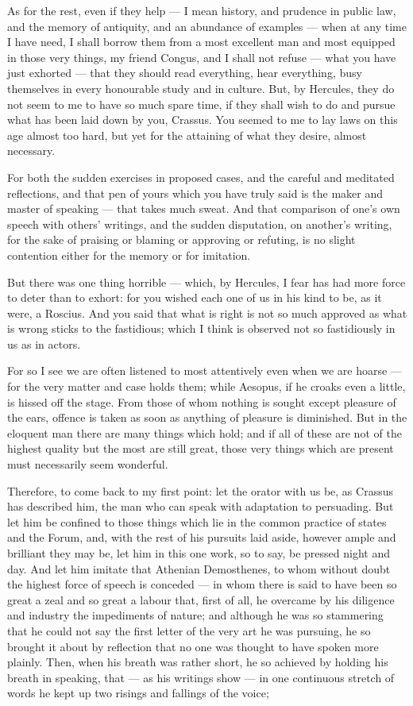  As for the rest, even if they help — I mean history, and prudence in public law, and the memory of antiquity, and an abundance of examples — when at any time I have need, I shall borrow them from a most excellent man and most equipped in those very things, my friend Congus, and I shall not refuse — what you have just exhorted — that they should read everything, hear everything, busy themselves in every honourable study and in culture. But, by Hercules, they do not seem to me to have so much spare time, if they shall wish to do and pursue what has been laid down by you, Crassus. You seemed to me to lay laws on this age almost too hard, but yet for the attaining of what they desire, almost necessary.

 For both the sudden exercises in proposed cases, and the careful and meditated reflections, and that pen of yours which you have truly said is the maker and master of speaking — that takes much sweat. And that comparison of one's own speech with others' writings, and the sudden disputation, on another's writing, for the sake of praising or blaming or approving or refuting, is no slight contention either for the memory or for imitation.

 But there was one thing horrible — which, by Hercules, I fear has had more force to deter than to exhort: for you wished each one of us in his kind to be, as it were, a Roscius. And you said that what is right is not so much approved as what is wrong sticks to the fastidious; which I think is observed not so fastidiously in us as in actors.

 For so I see we are often listened to most attentively even when we are hoarse — for the very matter and case holds them; while Aesopus, if he croaks even a little, is hissed off the stage. From those of whom nothing is sought except pleasure of the ears, offence is taken as soon as anything of pleasure is diminished. But in the eloquent man there are many things which hold; and if all of these are not of the highest quality but the most are still great, those very things which are present must necessarily seem wonderful.

 Therefore, to come back to my first point: let the orator with us be, as Crassus has described him, the man who can speak with adaptation to persuading. But let him be confined to those things which lie in the common practice of states and the Forum, and, with the rest of his pursuits laid aside, however ample and brilliant they may be, let him in this one work, so to say, be pressed night and day. And let him imitate that Athenian Demosthenes, to whom without doubt the highest force of speech is conceded — in whom there is said to have been so great a zeal and so great a labour that, first of all, he overcame by his diligence and industry the impediments of nature; and although he was so stammering that he could not say the first letter of the very art he was pursuing, he so brought it about by reflection that no one was thought to have spoken more plainly. Then, when his breath was rather short, he so achieved by holding his breath in speaking, that — as his writings show — in one continuous stretch of words he kept up two risings and fallings of the voice;

